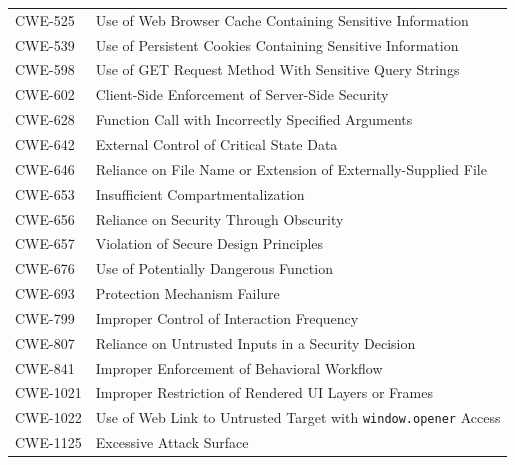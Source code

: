 \documentclass[11pt]{article}
\begin{document}
\begin{longtable}{@{}p{2.4cm}p{12.0cm}@{}}
CWE-525  & Use of Web Browser Cache Containing Sensitive Information \\
CWE-539  & Use of Persistent Cookies Containing Sensitive Information \\
CWE-598  & Use of GET Request Method With Sensitive Query Strings \\
CWE-602  & Client-Side Enforcement of Server-Side Security \\
CWE-628  & Function Call with Incorrectly Specified Arguments \\
CWE-642  & External Control of Critical State Data \\
CWE-646  & Reliance on File Name or Extension of Externally-Supplied File \\
CWE-653  & Insufficient Compartmentalization \\
CWE-656  & Reliance on Security Through Obscurity \\
CWE-657  & Violation of Secure Design Principles \\
CWE-676  & Use of Potentially Dangerous Function \\
CWE-693  & Protection Mechanism Failure \\
CWE-799  & Improper Control of Interaction Frequency \\
CWE-807  & Reliance on Untrusted Inputs in a Security Decision \\
CWE-841  & Improper Enforcement of Behavioral Workflow \\
CWE-1021 & Improper Restriction of Rendered UI Layers or Frames \\
CWE-1022 & Use of Web Link to Untrusted Target with \texttt{window.opener} Access \\
CWE-1125 & Excessive Attack Surface \\

\end{longtable}
\end{document}
